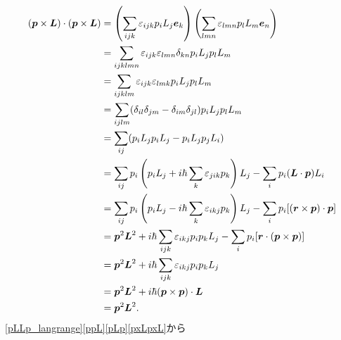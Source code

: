 \begin{align}
  (\boldsymbol{p}\times\boldsymbol{L})\cdot(\boldsymbol{p}\times\boldsymbol{L})
  & = \left(\sum_{ijk}\varepsilon_{ijk}p_iL_j\boldsymbol{e}_k\right)\left(\sum_{lmn}\varepsilon_{lmn}p_lL_m\boldsymbol{e}_n\right)\notag\\
  & = \sum_{ijklmn}\varepsilon_{ijk}\varepsilon_{lmn}\delta_{kn}p_iL_jp_lL_m\notag\\
  & = \sum_{ijklm}\varepsilon_{ijk}\varepsilon_{lmk}p_iL_jp_lL_m\notag\\
  & = \sum_{ijlm}(\delta_{il}\delta_{jm} - \delta_{im}\delta_{jl})p_iL_jp_lL_m\notag\\
  & = \sum_{ij}(p_iL_jp_iL_j - p_iL_jp_jL_i)\notag\\
  & = \sum_{ij}p_i\left(p_iL_j + i\hbar\sum_k\varepsilon_{jik}p_k\right)L_j - \sum_ip_i(\boldsymbol{L}\cdot\boldsymbol{p})L_i\notag\\
  & = \sum_{ij}p_i\left(p_iL_j - i\hbar\sum_k\varepsilon_{ikj}p_k\right)L_j - \sum_ip_i[(\boldsymbol{r}\times\boldsymbol{p})\cdot\boldsymbol{p}]\notag\\
  & = \boldsymbol{p}^2\boldsymbol{L}^2 + i\hbar\sum_{ijk}\varepsilon_{ikj}p_ip_kL_j - \sum_ip_i[\boldsymbol{r}\cdot(\boldsymbol{p}\times\boldsymbol{p})]\notag\\
  & = \boldsymbol{p}^2\boldsymbol{L}^2 + i\hbar\sum_{ijk}\varepsilon_{ikj}p_ip_kL_j\notag\\
  & = \boldsymbol{p}^2\boldsymbol{L}^2 + i\hbar(\boldsymbol{p}\times\boldsymbol{p})\cdot\boldsymbol{L}\notag\\
  & = \boldsymbol{p}^2\boldsymbol{L}^2.\label{pxLpxL}
\end{align}
\eqref{pLLp_langrange}\eqref{ppL}\eqref{pLp}\eqref{pxLpxL}から

